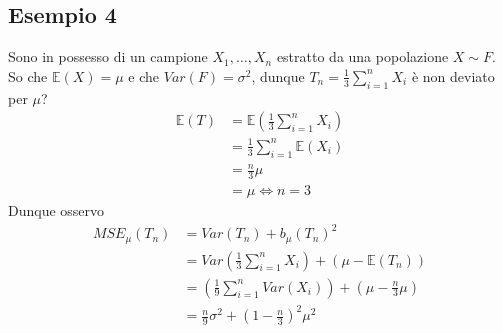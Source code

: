 \documentclass[11pt]{report}
\begin{document}
\subsection{Esempio 4}
Sono in possesso di un campione $X_1, \dots, X_n$ estratto da una popolazione $X \sim F$. So che $\mathbb{E}(X) = \mu$ e che $Var(F) = \sigma^2$, dunque $T_n = \frac{1}{3} \sum_{i=1}^n X_i$ è non deviato per $\mu$?
\begin{equation}
    \begin{split}
        \mathbb{E}(T) & = \mathbb{E} \left( \frac{1}{3} \sum_{i=1}^n X_i \right)\\
        & = \frac{1}{3} \sum_{i=1}^n \mathbb{E}(X_i)\\
        & = \frac{n}{3} \mu\\
        & = \mu \iff n = 3
    \end{split}
\end{equation}
Dunque osservo
\begin{equation}
    \begin{split}
        MSE_\mu(T_n) & = Var(T_n) + b_\mu(T_n)^2\\
        & = Var \left( \frac{1}{3} \sum_{i=1}^n X_i \right) + \left( \mu - \mathbb{E}(T_n) \right)\\
        & = \left( \frac{1}{9} \sum_{i=1}^n Var(X_i) \right)+ \left( \mu - \frac{n}{3}\mu \right)\\
        & = \frac{n}{9}\sigma^2 + \left( 1 - \frac{n}{3} \right)^2\mu^2
    \end{split}
\end{equation}
\end{document}

